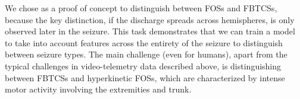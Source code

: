 We chose as a proof of concept to distinguish between \acp{FOS} and \acp{FBTCS}, because the key distinction, if the discharge spreads across hemispheres, is only observed later in the seizure.
This task demonstrates that we can train a model to take into account features across the entirety of the seizure to distinguish between seizure types.
The main challenge (even for humans), apart from the typical challenges in video-telemetry data described above, is distinguishing between \acp{FBTCS} and hyperkinetic \acp{FOS}, which are characterized by intense motor activity involving the extremities and trunk.
